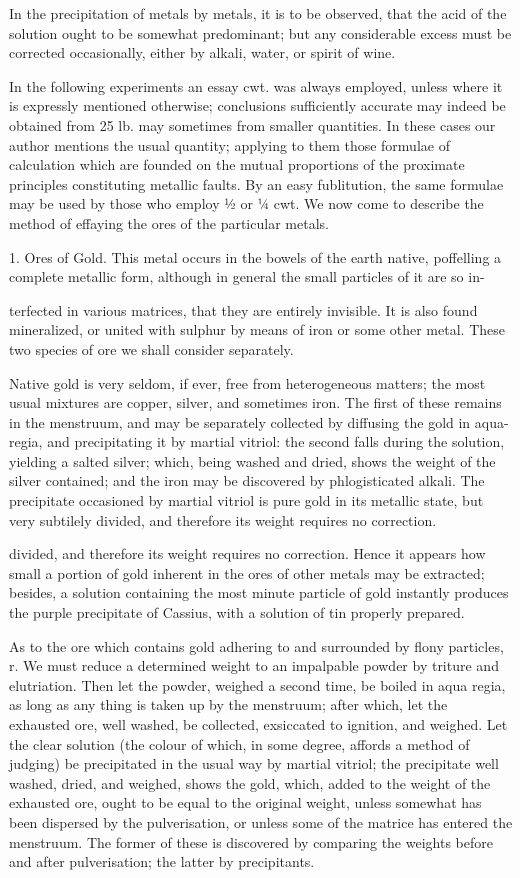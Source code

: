 \documentclass{article}
\begin{document}
In the precipitation of metals by metals, it is to be observed, that the acid of the solution ought to be somewhat predominant; but any considerable excess must be corrected occasionally, either by alkali, water, or spirit of wine.

In the following experiments an essay cwt. was always employed, unless where it is expressly mentioned otherwise; conclusions sufficiently accurate may indeed be obtained from 25 lb. may sometimes from smaller quantities. In these cases our author mentions the usual quantity; applying to them those formulae of calculation which are founded on the mutual proportions of the proximate principles constituting metallic faults. By an easy fublitution, the same formulae may be used by those who employ ½ or ¼ cwt. We now come to describe the method of effaying the ores of the particular metals.

1. Ores of Gold. This metal occurs in the bowels of the earth native, poffelling a complete metallic form, although in general the small particles of it are so in-

terfected in various matrices, that they are entirely invisible. It is also found mineralized, or united with sulphur by means of iron or some other metal. These two species of ore we shall consider separately.

Native gold is very seldom, if ever, free from heterogeneous matters; the most usual mixtures are copper, silver, and sometimes iron. The first of these remains in the menstruum, and may be separately collected by diffusing the gold in aqua-regia, and precipitating it by martial vitriol: the second falls during the solution, yielding a salted silver; which, being washed and dried, shows the weight of the silver contained; and the iron may be discovered by phlogisticated alkali. The precipitate occasioned by martial vitriol is pure gold in its metallic state, but very subtilely divided, and therefore its weight requires no correction.

divided, and therefore its weight requires no correction. Hence it appears how small a portion of gold inherent in the ores of other metals may be extracted; besides, a solution containing the most minute particle of gold instantly produces the purple precipitate of Cassius, with a solution of tin properly prepared.

As to the ore which contains gold adhering to and surrounded by flony particles, r. We must reduce a determined weight to an impalpable powder by triture and elutriation. Then let the powder, weighed a second time, be boiled in aqua regia, as long as any thing is taken up by the menstruum; after which, let the exhausted ore, well washed, be collected, exsiccated to ignition, and weighed. Let the clear solution (the colour of which, in some degree, affords a method of judging) be precipitated in the usual way by martial vitriol; the precipitate well washed, dried, and weighed, shows the gold, which, added to the weight of the exhausted ore, ought to be equal to the original weight, unless somewhat has been dispersed by the pulverisation, or unless some of the matrice has entered the menstruum. The former of these is discovered by comparing the weights before and after pulverisation; the latter by precipitants.
\end{document}
